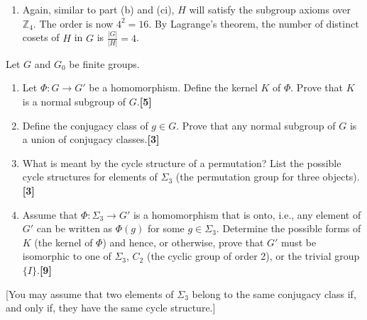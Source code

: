 \documentclass[a4paper]{article}
\begin{document}
\begin{ans}
\begin{enumerate}[label=(\alph*)]
\begin{enumerate}[label=(\roman*)]
\begin{itemize}
    \item inverse: when $x+x'=0$, $y'+xz'+y=0$ and $z+z'=0$, we can find solutions $x',y',z'\in\mathbb{Z}_4$, so we have an inverse.
\end{itemize}
There are 4 possibilities for $x,y,z$ and so $4^3$ distinct matrices. The order of $G$ is $4^3=64$.
\item Again, similar to part (b) and (ci), $H$ will satisfy the subgroup axioms over $\mathbb{Z}_4$. The order is now $4^2=16$. By Lagrange's theorem, the number of distinct cosets of $H$ in $G$ is $\frac{|G|}{|H|}=4$.
\end{enumerate}
\end{enumerate}
\end{ans}
\begin{qns}
Let $G$ and $G_0$ be finite groups.
\begin{enumerate}[label=(\alph*)]
\item Let $\Phi:G\rightarrow G'$ be a homomorphism. Define the kernel $K$ of $\Phi$. Prove that $K$ is a normal subgroup of $G$.\hfill\textbf{[5]}
\item Define the conjugacy class of $g\in G$. Prove that any normal subgroup of $G$ is a union of conjugacy classes.\hfill\textbf{[3]}
\item What is meant by the cycle structure of a permutation? List the possible cycle structures for elements of $\Sigma_3$ (the permutation group for three objects).\hfill\textbf{[3]}
\item Assume that $\Phi:\Sigma_3\rightarrow G'$ is a homomorphism that is onto, i.e., any element of $G'$ can be written as $\Phi(g)$ for some $g\in\Sigma_3$. Determine the possible forms of $K$ (the kernel of $\Phi$) and hence, or otherwise, prove that $G'$ must be isomorphic to one of $\Sigma_3$, $C_2$ (the cyclic group of order 2), or the trivial group $\{I\}$.\hfill\textbf{[9]}
\end{enumerate}
[You may assume that two elements of $\Sigma_3$ belong to the same conjugacy class if, and only if, they have the same cycle structure.]
\end{qns}
\end{document}
